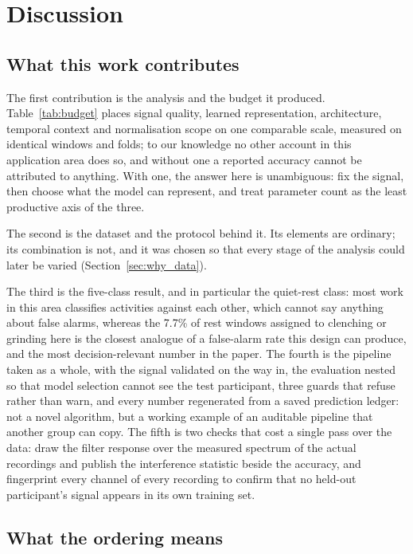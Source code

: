 \documentclass[pdflatex,sn-nature,iicol]{sn-jnl}
\begin{document}
\section{Discussion}

\subsection{What this work contributes}

The first contribution is the analysis and the budget it produced. Table~\ref{tab:budget} places signal quality, learned representation, architecture, temporal context and normalisation scope on one comparable scale, measured on identical windows and folds; to our knowledge no other account in this application area does so, and without one a reported accuracy cannot be attributed to anything. With one, the answer here is unambiguous: fix the signal, then choose what the model can represent, and treat parameter count as the least productive axis of the three.

The second is the dataset and the protocol behind it. Its elements are ordinary; its combination is not, and it was chosen so that every stage of the analysis could later be varied (Section~\ref{sec:why_data}).

The third is the five-class result, and in particular the quiet-rest class: most work in this area classifies activities against each other, which cannot say anything about false alarms, whereas the 7.7\% of rest windows assigned to clenching or grinding here is the closest analogue of a false-alarm rate this design can produce, and the most decision-relevant number in the paper. The fourth is the pipeline taken as a whole, with the signal validated on the way in, the evaluation nested so that model selection cannot see the test participant, three guards that refuse rather than warn, and every number regenerated from a saved prediction ledger: not a novel algorithm, but a working example of an auditable pipeline that another group can copy. The fifth is two checks that cost a single pass over the data: draw the filter response over the measured spectrum of the actual recordings and publish the interference statistic beside the accuracy, and fingerprint every channel of every recording to confirm that no held-out participant's signal appears in its own training set.

\subsection{What the ordering means}
\end{document}
